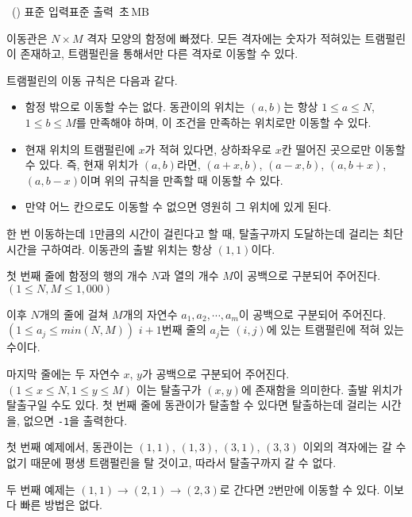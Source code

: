 \begin{problem}{\kcpcprobtrap\ (\kcpcprobtrapshort)}
    {표준 입력}{표준 출력}
    {\kcpcprobtraptime\,초}{\kcpcprobtrapmemory\,MB}{}
    
    이동관은 $ N \times M$ 격자 모양의 함정에 빠졌다. 모든 격자에는 숫자가 적혀있는 트램펄린이 존재하고, 트램펄린을 통해서만 다른 격자로 이동할 수 있다.
    
    트램펄린의 이동 규칙은 다음과 같다.
    
    \begin{itemize}
        \item 함정 밖으로 이동할 수는 없다. 동관이의 위치는 $(a, b)$는 항상 $1 \leq a \leq N$, $1 \leq b \leq M$를 만족해야 하며, 이 조건을 만족하는 위치로만 이동할 수 있다.
        \item 현재 위치의 트램펄린에 $ x $가 적혀 있다면, 상하좌우로 $ x $칸 떨어진 곳으로만 이동할 수 있다. 즉, 현재 위치가 $(a, b)$라면, $(a+x, b)$, $(a-x, b)$, $(a, b+x)$, $(a, b-x)$이며 위의 규칙을 만족할 때 이동할 수 있다.
        \item 만약 어느 칸으로도 이동할 수 없으면 영원히 그 위치에 있게 된다.
    \end{itemize}
    
    한 번 이동하는데 1만큼의 시간이 걸린다고 할 때, 탈출구까지 도달하는데 걸리는 최단 시간을 구하여라. 이동관의 출발 위치는 항상 $(1, 1)$이다.
    
    \InputFile
    첫 번째 줄에 함정의 행의 개수 $ N $과 열의 개수 $ M $이 공백으로 구분되어 주어진다. $( 1 \leq N, M \leq 1,000 ) $
    
    이후 $N$개의 줄에 걸쳐 $M$개의 자연수 $a_{1}, a_{2}, \cdots, a_{m}$이 공백으로 구분되어 주어진다. $ (1 \leq a_{j} \leq min(N,M)) $ $i+1$번째 줄의 $a_{j}$는 $ (i, j) $에 있는 트램펄린에 적혀 있는 수이다.
    
    마지막 줄에는 두 자연수 $x$, $y$가 공백으로 구분되어 주어진다. $(1 \leq x \leq N, 1 \leq y \leq M) $ 이는 탈출구가 $ (x, y) $에 존재함을 의미한다. 출발 위치가 탈출구일 수도 있다.
    \OutputFile
    첫 번째 줄에 동관이가 탈출할 수 있다면 탈출하는데 걸리는 시간을, 없으면 \texttt{-1}을 출력한다.
   
    \Examples
    
    \begin{example}
    \end{example}
    
    \Explanation
    첫 번째 예제에서, 동관이는 $ (1,1) $, $ (1,3) $, $ (3,1) $, $ (3,3) $ 이외의 격자에는 갈 수 없기 때문에 평생 트램펄린을 탈 것이고, 따라서 탈출구까지 갈 수 없다.
    
    두 번째 예제는 $ (1,1) \rightarrow (2,1) \rightarrow (2,3)$로 간다면 2번만에 이동할 수 있다. 이보다 빠른 방법은 없다.
    
    
\end{problem}

